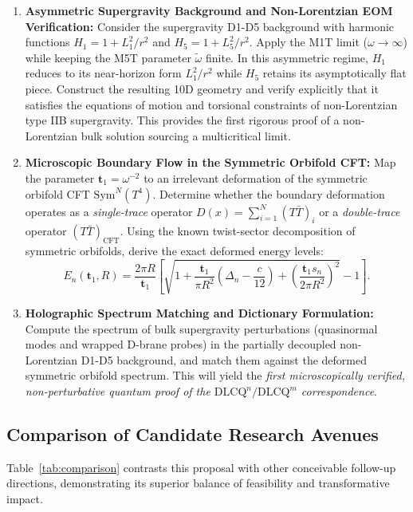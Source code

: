 \documentclass[11pt,a4paper]{article}
\begin{document}
\begin{enumerate}
    \item \textbf{Asymmetric Supergravity Background and Non-Lorentzian EOM Verification:}
    Consider the supergravity D1-D5 background with harmonic functions $H_1 = 1 + L_1^2/r^2$ and $H_5 = 1 + L_5^2/r^2$. Apply the M1T limit ($\omega \to \infty$) while keeping the M5T parameter $\tilde{\omega}$ finite. In this asymmetric regime, $H_1$ reduces to its near-horizon form $L_1^2/r^2$ while $H_5$ retains its asymptotically flat piece. 
    Construct the resulting 10D geometry and verify explicitly that it satisfies the equations of motion and torsional constraints of non-Lorentzian type IIB supergravity. This provides the first rigorous proof of a non-Lorentzian bulk solution sourcing a multicritical limit.

    \item \textbf{Microscopic Boundary Flow in the Symmetric Orbifold CFT:}
    Map the parameter $\mathbf{t}_1 = \omega^{-2}$ to an irrelevant deformation of the symmetric orbifold CFT $\mathrm{Sym}^N(T^4)$. Determine whether the boundary deformation operates as a \emph{single-trace} operator $D(x) = \sum_{i=1}^N (T\bar{T})_i$ or a \emph{double-trace} operator $(T\bar{T})_{\text{CFT}}$. Using the known twist-sector decomposition of symmetric orbifolds, derive the exact deformed energy levels:
    \begin{equation}
        E_n(\mathbf{t}_1, R) = \frac{2\pi R}{\mathbf{t}_1} \left[ \sqrt{1 + \frac{\mathbf{t}_1}{\pi R^2} \left( \Delta_n - \frac{c}{12} \right) + \left( \frac{\mathbf{t}_1 s_n}{2\pi R^2} \right)^2 } - 1 \right].
    \end{equation}

    \item \textbf{Holographic Spectrum Matching and Dictionary Formulation:}
    Compute the spectrum of bulk supergravity perturbations (quasinormal modes and wrapped D-brane probes) in the partially decoupled non-Lorentzian D1-D5 background, and match them against the deformed symmetric orbifold spectrum. This will yield the \emph{first microscopically verified, non-perturbative quantum proof of the $\text{DLCQ}^n/\text{DLCQ}^m$ correspondence}.
\end{enumerate}

\subsection{Comparison of Candidate Research Avenues}
Table~\ref{tab:comparison} contrasts this proposal with other conceivable follow-up directions, demonstrating its superior balance of feasibility and transformative impact.
\end{document}
